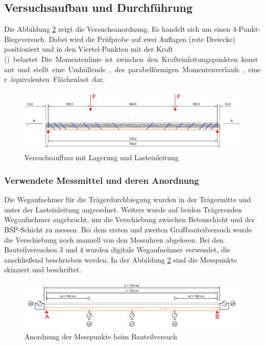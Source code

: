 \subsection{Versuchsaufbau und Durchführung}
\label{abs:Versuchsbaufaufbau_Durchführung}
Die Abbildung \ref{versuchsaufbau} zeigt die Versuchsanordnung. Es handelt sich um einen 4-Punkt-Biegeversuch.   
Dabei wird die Prüfprobe auf zwei Auflagen (rote Dreiecke) positioniert und in den Viertel-Punkten mit der Kraft (\unit[F]) belastet. Die Momentenlinie ist zwischen den Krafteinleitungspunkten konstant und stellt eine Umhüllende, des parabelförmigen Momentenverlaufs, einer äquivalenten Flächenlast dar.

\begin{figure}[h]
\begin{center}
\includegraphics[scale =0.8]{Versuchsaufbau/versuchsaufbau.png}
\caption{Versuchsaufbau mit Lagerung und Lasteinleitung}
\label{versuchsaufbau}
\end{center}
\end{figure}

\subsubsection{Verwendete Messmittel und deren Anordnung}

 Die Wegaufnehmer für die Trägerdurchbiegung wurden in der Trägermitte und unter der Lasteinleitung angeordnet. Weiters wurde auf beiden Trägerenden Wegaufnehmer angebracht, um die Verschiebung zwischen Betonschicht und der BSP-Schicht zu messen. Bei dem ersten und zweiten Großbauteilversuch wurde die Verschiebung noch manuell von den Messuhren abgelesen. Bei den Bauteilversuchen 3 und 4 wurden  digitale Wegaufnehmer verwendet, die anschließend beschrieben werden. 
In der Abbildung \ref{versuchsaufbau} sind die Messpunkte skizziert und beschriftet.

\begin{figure}[h!]
\begin{center}
\includegraphics[scale =0.8]{Versuchsaufbau/messanordnung.png}
\caption{Anordnung der Messpunkte beim Bauteilversuch}
\label{versuchsaufbau}
\end{center}
\end{figure}


